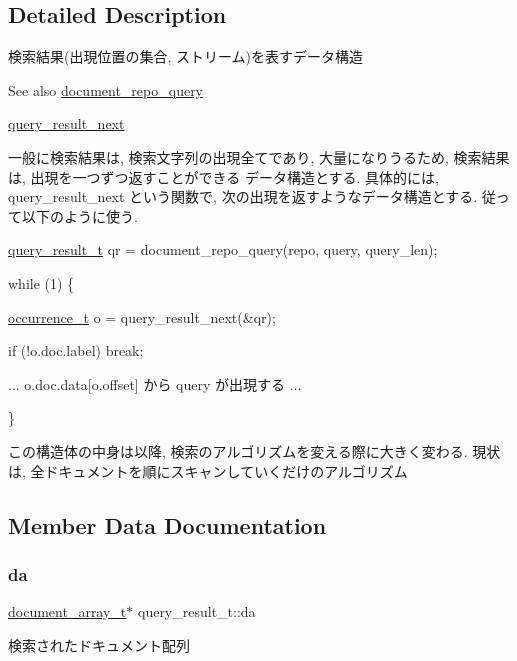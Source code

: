\subsection{Detailed Description}
検索結果(出現位置の集合, ストリーム)を表すデータ構造 

\begin{DoxySeeAlso}{See also}
\hyperlink{document__repository_8h_a8f61dbccc6befcc6affb3f6461bff262}{document\+\_\+repo\+\_\+query} 

\hyperlink{document__repository_8h_a7831dbf9173888563e4f19519d700472}{query\+\_\+result\+\_\+next}
\end{DoxySeeAlso}
一般に検索結果は, 検索文字列の出現全てであり, 大量になりうるため, 検索結果は, 出現を一つずつ返すことができる データ構造とする. 具体的には, query\+\_\+result\+\_\+next という関数で, 次の出現を返すようなデータ構造とする. 従って以下のように使う.

\hyperlink{structquery__result__t}{query\+\_\+result\+\_\+t} qr = document\+\_\+repo\+\_\+query(repo, query, query\+\_\+len);

while (1) \{

\hyperlink{structoccurrence__t}{occurrence\+\_\+t} o = query\+\_\+result\+\_\+next(\&qr);

if (!o.doc.\+label) break;

... o.\+doc.\+data\mbox{[}o.\+offset\mbox{]} から query が出現する ...

\}

この構造体の中身は以降, 検索のアルゴリズムを変える際に大きく変わる. 現状は, 全ドキュメントを順にスキャンしていくだけのアルゴリズム 

\subsection{Member Data Documentation}
\mbox{\label{structquery__result__t_a4b3bddcf5a7c3a3f30ef0ae4c2fe3935}} 
\subsubsection{\texorpdfstring{da}{da}}
{\footnotesize\ttfamily \hyperlink{structdocument__array__t}{document\+\_\+array\+\_\+t}$\ast$ query\+\_\+result\+\_\+t\+::da}

検索されたドキュメント配列 \mbox{\label{structquery__result__t_a73621c1e37c31f8b11ee795c1ffaf808}} 
